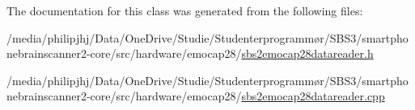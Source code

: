 The documentation for this class was generated from the following files\-:\begin{DoxyCompactItemize}
\item 
/media/philipjhj/\-Data/\-One\-Drive/\-Studie/\-Studenterprogrammør/\-S\-B\-S3/smartphonebrainscanner2-\/core/src/hardware/emocap28/\hyperlink{sbs2emocap28datareader_8h}{sbs2emocap28datareader.\-h}\item 
/media/philipjhj/\-Data/\-One\-Drive/\-Studie/\-Studenterprogrammør/\-S\-B\-S3/smartphonebrainscanner2-\/core/src/hardware/emocap28/\hyperlink{sbs2emocap28datareader_8cpp}{sbs2emocap28datareader.\-cpp}\end{DoxyCompactItemize}
